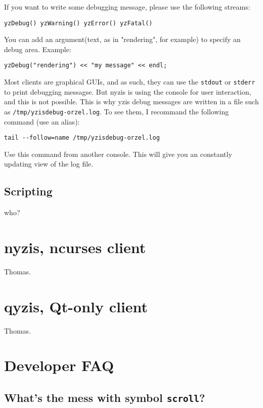 \documentclass[a4paper,12pt]{report}
\begin{document}
If you want to write some debugging message, please use the following
streams:

\begin{verbatim}
yzDebug() yzWarning() yzError() yzFatal()
\end{verbatim}

You can add an argument(text, as in "rendering", for example) to specify an
debug area. Example:

\begin{verbatim}
yzDebug("rendering") << "my message" << endl;
\end{verbatim}

Most clients are graphical GUIs, and as such,
they can use the \verb+stdout+ or \verb+stderr+ to print debugging
messagse. But nyzis is using the console for user interaction, and this
is not possible. This is why yzis debug messages are written in a file such
as \verb+/tmp/yzisdebug-orzel.log+. To see them, I recommand the following
command (use an alias):

\begin{verbatim}
tail --follow=name /tmp/yzisdebug-orzel.log
\end{verbatim}

Use this command from another console. This will give you an constantly updating
view of the log file.

\section{Scripting}

who?

\chapter{nyzis, ncurses client}

Thomas.

\chapter{qyzis, Qt-only client}

Thomas.

\chapter{Developer FAQ}

\section{What's the mess with symbol \texttt{scroll}?}
\end{document}
